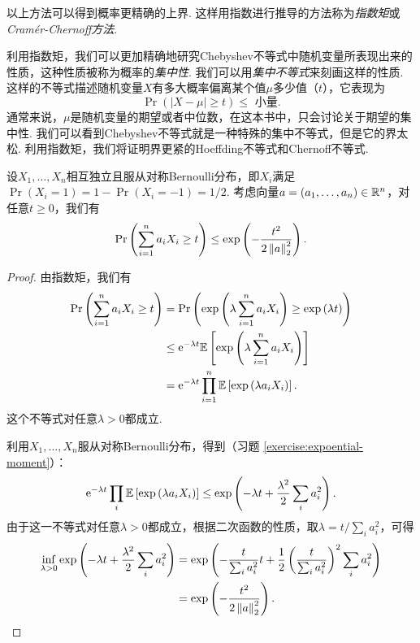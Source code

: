 以上方法可以得到概率更精确的上界. 这样用指数进行推导的方法称为\textit{指数矩}或\textit{Cramér-Chernoff方法}. 

利用指数矩，我们可以更加精确地研究Chebyshev不等式中随机变量所表现出来的性质，这种性质被称为概率的\textit{集中性}. 我们可以用\textit{集中不等式}来刻画这样的性质. 这样的不等式描述随机变量$X$有多大概率偏离某个值$\mu$多少值（$t$），它表现为
\[
\Pr(| X - \mu| \geq t) \leq \text{ 小量}.
\]
通常来说，$\mu$是随机变量的期望或者中位数，在这本书中，只会讨论关于期望的集中性. 我们可以看到Chebyshev不等式就是一种特殊的集中不等式，但是它的界太松. 利用指数矩，我们将证明界更紧的Hoeffding不等式和Chernoff不等式. 

\begin{theorem}\label{thm:hoeffding-inequality}
    设$X_1, \dots, X_n$相互独立且服从对称Bernoulli分布，即$X_i$满足$\Pr(X_i=1)=1-\Pr(X_i=-1)=1/2$. 考虑向量$a = (a_1, \dots, a_n) \in \mathbb{R}^n$，对任意$t\geq0$，我们有
    \[
        \Pr\left(\sum_{i=1}^n a_i X_i \geq t\right)\leq \exp \left( - \frac{t^2}{2\left\|a\right\|^2_2}\right).
    \]
\end{theorem}
\begin{proof}
由指数矩，我们有
\[
\begin{aligned}
    \Pr\left(\sum_{i=1}^n a_i X_i \geq t\right) &= \Pr\left(\exp\left(\lambda \sum_{i=1}^n a_i X_i\right) \geq \exp\left(\lambda t\right)\right) \\
    &\leq \mathrm{e}^{-\lambda t} \mathbb{E} \left[\exp\left(\lambda \sum_{i=1}^n a_i X_i\right)\right]\\
    &=  \mathrm{e}^{-\lambda t}\prod_{i=1}^n \mathbb{E}\left[\exp\left(\lambda a_i X_i\right)\right].
\end{aligned}
\]
这个不等式对任意$\lambda > 0$都成立. 

利用$X_1, \dots, X_n$服从对称Bernoulli分布，得到（习题 \ref{exercise:expoential-moment}）：
\begin{equation}
\mathrm{e}^{-\lambda t}\prod_{i} \mathbb{E}\left[\exp\left(\lambda a_i X_i\right)\right]\leq\exp \left(-\lambda t + \frac{\lambda^2}{2} \sum_{i} a_i^2\right).\label{eq:exponential-moment}
\end{equation}
由于这一不等式对任意$\lambda > 0$都成立，根据二次函数的性质，取$\lambda = t / \sum_i a_i^2$，可得
\[
\begin{aligned}
    \inf_{\lambda>0}\exp \left(-\lambda t + \frac{\lambda^2}{2} \sum_{i} a_i^2\right) &=\exp\left( -\frac{t}{\sum_i a_i^2} t + \frac12 \left(\frac{t}{\sum_i a_i^2}\right)^2 \sum_{i} a_i^2\right) \\
    &= \exp \left( - \frac{t^2}{2\left\|a\right\|_2^2}\right).
\end{aligned}
\]
\end{proof}

